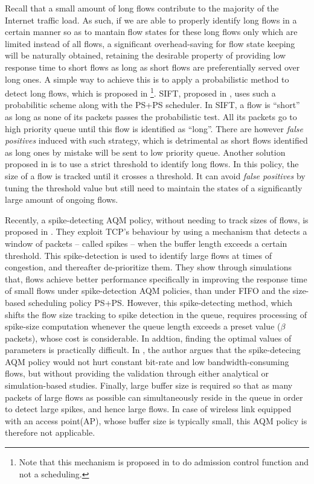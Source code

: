 \documentclass[preprint,12pt]{elsarticle}
\begin{document}
Recall that a small amount of long flows contribute to the majority of the Internet traffic load. As such, if we are able to properly identify long flows in a certain manner so as to mantain flow states for these long flows only which are limited instead of all flows, a significant overhead-saving for flow state keeping will be naturally obtained, retaining the desirable property of providing low response time to short flows as long as short flows are preferentially served over long ones. A simple way to achieve this is to apply a probabilistic method to detect long flows, which is proposed in \cite{Kortebi04Xprotect,Psounis05Sift}\footnote{Note that this mechanism is proposed in \cite{Kortebi04Xprotect} to do admission control function and not a scheduling.}. SIFT, proposed in \cite{Psounis05Sift}, uses such a probabilitic scheme along with the PS+PS scheduler. In SIFT, a flow is ``short'' as long as none of its packets passes the probabilistic test. All its packets go to high priority queue until this flow is identified as ``long''. There are however \textit{false positives} induced with such strategy, which is detrimental as short flows identified as long ones by mistake will be sent to low priority queue. Another solution proposed in \cite{DivakaranCAP10} is to use a strict threshold to identify long flows. In this policy, the size of a flow is tracked until it crosses a threshold. It can avoid \textit{false positives} by tuning the threshold value but still need to maintain the states of a significantly large amount of ongoing flows. 

Recently, a spike-detecting AQM policy, without needing to track sizes of flows, is proposed in \cite{DivakaranAP11,Divakaran2012networks}. They exploit TCP's behaviour by using a mechanism that detects a window of packets -- called spikes -- when the buffer length exceeds a certain threshold. This spike-detection is used to identify large flows at times of congestion, and thereafter de-prioritize them. They show through simulations that, flows achieve better performance specifically in improving the response time of small flows under spike-detection AQM policies, than under FIFO and the size-based scheduling policy PS+PS. However, this spike-detecting method, which shifts the flow size tracking to spike detection in the queue, requires processing of spike-size computation whenever the queue length exceeds a preset value ($\beta$ packets), whose cost is considerable. In addtion, finding the optimal values of parameters is practically difficult. In \cite{Divakaran2012networks}, the author argues that the spike-detecing AQM policy would not hurt constant bit-rate and low bandwidth-consuming flows, but without providing the validation through either analytical or simulation-based studies. Finally, large buffer size is required so that as many packets of large flows as possible can simultaneously reside in the queue in order to detect large spikes, and hence large flows. In case of wireless link equipped with an access point(AP), whose buffer size is typically small, this AQM policy is therefore not applicable.
\end{document}
